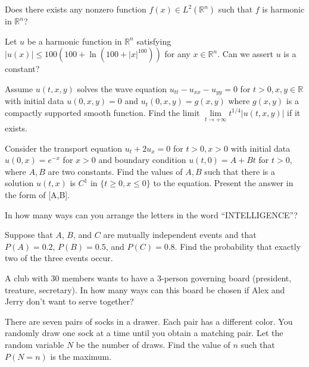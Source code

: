 \begin{problem} Does there exists any nonzero function $f(x)\in L^2(\mathbb{R}^n)$ such that $f$ is harmonic in $\mathbb{R}^n$?
\end{problem}

\begin{problem} Let $u$ be a harmonic function in $\mathbb{R}^n$ satisfying $|u(x)|\leq 100(100+\ln(100+|x|^{100}))$ for any $x\in\mathbb{R}^n$. Can we assert $u$ is a constant?
\end{problem}

\begin{problem} Assume $u(t,x,y)$ solves the wave equation $u_{tt}-u_{xx}-u_{yy}=0$ for $t>0,x,y\in\mathbb{R}$ with initial data $u(0,x,y)=0$ and $u_t(0,x,y)=g(x,y)$ where $g(x,y)$ is a compactly supported smooth function. Find the limit $\lim\limits_{t\to+\infty}t^{1/4}|u(t,x,y)|$ if it exists. 
\end{problem}

\begin{problem} Consider the transport equation $u_t+2u_x=0$ for $t>0,x>0$ with initial data $u(0,x)=e^{-x}$ for $x>0$ and boundary condition $u(t,0)=A+Bt$ for $t>0$, where $A,B$ are two constants. Find the values of $A,B$ such that there is a solution $u(t,x)$ is $C^1$ in $\{t\geq 0,x\leq 0\}$ to the equation. Present the answer in the form of [A,B]. 
\end{problem}

\newpage 






\begin{problem}     In how many ways can you arrange the letters in the word ``INTELLIGENCE''?
\end{problem}

\begin{problem}     Suppose that $A$, $B$, and $C$ are mutually independent events and that $P(A) = 0.2$, $P(B) = 0.5$, and $P(C) = 0.8$. Find the probability that exactly two of the three events occur.
\end{problem}

\begin{problem}     A club with 30 members wants to have a 3-person governing board (president, treature, secretary). In how many ways can this board be chosen if Alex and Jerry don’t want to serve together?
\end{problem}

\begin{problem}    There are seven pairs of socks in a drawer. Each pair has a different color. You randomly draw one sock at a time until you obtain a matching pair. Let the random variable $N$ be the number of draws. Find the value of $n$ such that $P(N=n)$ is the maximum.
\end{problem}

